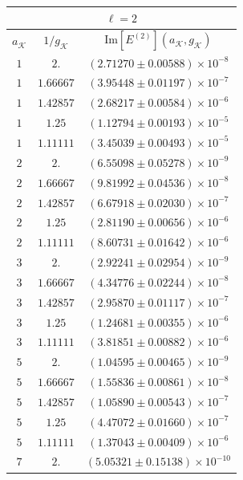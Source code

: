 \documentclass[english,aps,prd,nofootinbib,twocolumn]{revtex4-1}
\begin{document}
\begin{table}
\begin{tabular}{ccc}
\multicolumn{3}{c}{$\ell=2$}	\\ \hline \hline 
$a_{\mathcal{K}}$	&	$1/g_{\mathcal{K}}$	&	
$\mathrm{Im}[E^{(2)}](a_{\mathcal{K}},g_{\mathcal{K}})$	\\ \hline \hline 
    $ 1 $ & $ 2.      $ & $ (2.71270\pm 0.00588)\times 10^{-8} $ \\
    $ 1 $ & $ 1.66667 $ & $ (3.95448\pm 0.01197)\times 10^{-7} $ \\
    $ 1 $ & $ 1.42857 $ & $ (2.68217\pm 0.00584)\times 10^{-6} $ \\
    $ 1 $ & $ 1.25    $ & $ (1.12794\pm 0.00193)\times 10^{-5} $ \\
    $ 1 $ & $ 1.11111 $ & $ (3.45039\pm 0.00493)\times 10^{-5} $ \\ \hline \hline  
    $ 2 $ & $ 2.      $ & $ (6.55098\pm 0.05278)\times 10^{-9} $ \\
    $ 2 $ & $ 1.66667 $ & $ (9.81992\pm 0.04536)\times 10^{-8} $ \\
    $ 2 $ & $ 1.42857 $ & $ (6.67918\pm 0.02030)\times 10^{-7} $ \\
    $ 2 $ & $ 1.25    $ & $ (2.81190\pm 0.00656)\times 10^{-6} $ \\
    $ 2 $ & $ 1.11111 $ & $ (8.60731\pm 0.01642)\times 10^{-6} $ \\ \hline \hline  
    $ 3 $ & $ 2.      $ & $ (2.92241\pm 0.02954)\times 10^{-9} $ \\
    $ 3 $ & $ 1.66667 $ & $ (4.34776\pm 0.02244)\times 10^{-8} $ \\
    $ 3 $ & $ 1.42857 $ & $ (2.95870\pm 0.01117)\times 10^{-7} $ \\
    $ 3 $ & $ 1.25    $ & $ (1.24681\pm 0.00355)\times 10^{-6} $ \\
    $ 3 $ & $ 1.11111 $ & $ (3.81851\pm 0.00882)\times 10^{-6} $ \\ \hline \hline  
    $ 5 $ & $ 2.      $ & $ (1.04595\pm 0.00465)\times 10^{-9} $ \\
    $ 5 $ & $ 1.66667 $ & $ (1.55836\pm 0.00861)\times 10^{-8} $ \\
    $ 5 $ & $ 1.42857 $ & $ (1.05890\pm 0.00543)\times 10^{-7} $ \\
    $ 5 $ & $ 1.25    $ & $ (4.47072\pm 0.01660)\times 10^{-7} $ \\
    $ 5 $ & $ 1.11111 $ & $ (1.37043\pm 0.00409)\times 10^{-6} $ \\ \hline \hline  
    $ 7 $ & $ 2.      $ & $ (5.05321\pm 0.15138)\times 10^{-10} $ \\

\end{tabular}
\end{table}
\end{document}
